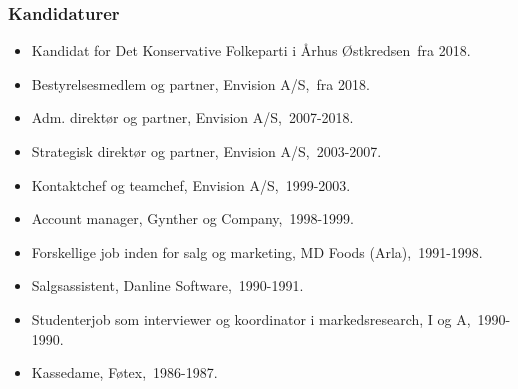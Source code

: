 \documentclass[11pt, a4paper]{awesome-cv}
\begin{document}
\begin{cvletter}
\subsubsection*{Kandidaturer}
\begin{itemize}
\item Kandidat for Det Konservative Folkeparti i Århus Østkredsen fra 2018.
\end{itemize}
\begin{itemize}
\item Bestyrelsesmedlem og partner, Envision A/S, fra 2018.
\item Adm. direktør og partner, Envision A/S, 2007-2018.
\item Strategisk direktør og partner, Envision A/S, 2003-2007.
\item Kontaktchef og teamchef, Envision A/S, 1999-2003.
\item Account manager, Gynther og Company, 1998-1999.
\item Forskellige job inden for salg og marketing, MD Foods (Arla), 1991-1998.
\item Salgsassistent, Danline Software, 1990-1991.
\item Studenterjob som interviewer og koordinator i markedsresearch, I og A, 1990-1990.
\item Kassedame, Føtex, 1986-1987.
\end{itemize}
\end{cvletter}
\end{document}
